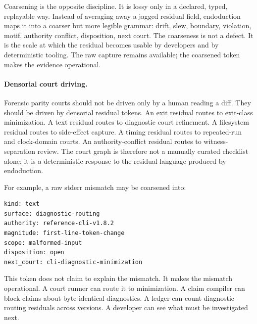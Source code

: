\documentclass[11pt,a4paper]{article}
\begin{document}
Coarsening is the opposite discipline. It is lossy only in a declared, typed, replayable way. Instead of averaging away a jagged residual field, endoduction maps it into a coarser but more legible grammar: drift, slew, boundary, violation, motif, authority conflict, disposition, next court. The coarseness is not a defect. It is the scale at which the residual becomes usable by developers and by deterministic tooling. The raw capture remains available; the coarsened token makes the evidence operational.

\paragraph{Densorial court driving.}
Forensic parity courts should not be driven only by a human reading a diff. They should be driven by densorial residual tokens. An exit residual routes to exit-class minimization. A text residual routes to diagnostic court refinement. A filesystem residual routes to side-effect capture. A timing residual routes to repeated-run and clock-domain courts. An authority-conflict residual routes to witness-separation review. The court graph is therefore not a manually curated checklist alone; it is a deterministic response to the residual language produced by endoduction.

For example, a raw stderr mismatch may be coarsened into:
\begin{verbatim}
kind: text
surface: diagnostic-routing
authority: reference-cli-v1.8.2
magnitude: first-line-token-change
scope: malformed-input
disposition: open
next_court: cli-diagnostic-minimization
\end{verbatim}

This token does not claim to explain the mismatch. It makes the mismatch operational. A court runner can route it to minimization. A claim compiler can block claims about byte-identical diagnostics. A ledger can count diagnostic-routing residuals across versions. A developer can see what must be investigated next.
\end{document}
